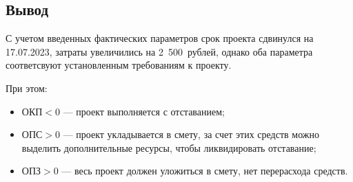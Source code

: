 
\subsection*{Вывод}

С учетом введенных фактических параметров срок проекта сдвинулся на 17.07.2023,
затраты увеличились на 2~500~рублей, однако оба параметра соответсвуют
установленным требованиям к проекту.

При этом:
\begin{itemize}
    \item $\text{ОКП} < 0$ --- проект выполняется с отставанием;
    \item $\text{ОПС} > 0$ --- проект укладывается в смету, за счет этих
        средств можно выделить дополнительные ресурсы, чтобы ликвидировать
        отставание;
    \item $\text{ОПЗ} > 0$ --- весь проект должен уложиться в смету, нет
        перерасхода средств.
\end{itemize}

